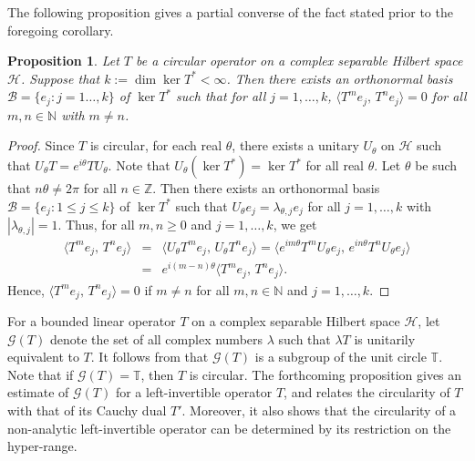 \documentclass[10pt,a4paper]{amsart}
\newtheorem{proposition}[theorem]{Proposition}%
\newcommand{\beqn}{\begin{eqnarray*}}
\newcommand{\eeqn}{\end{eqnarray*}}
\newcommand{\inp}[2]{\langle{#1},\,{#2} \rangle}
\begin{document}
The following proposition gives a partial converse of the fact stated prior to the foregoing corollary.

\begin{proposition}
Let $T$ be a circular operator on a complex separable Hilbert space $\mathcal H$. Suppose that $k := \dim \ker T^* < \infty$. Then there exists an orthonormal basis $\mathscr B = \{e_j : j=1 \ldots, k\}$ of $\ker T^*$ such that for all $j = 1, \ldots, k$, $\inp{T^m e_j}{T^n e_j} = 0$ for all $m, n \in \mathbb N$ with $m \neq n$.
\end{proposition}

\begin{proof}
Since $T$ is circular, for each real $\theta$, there exists a unitary $U_\theta$ on $\mathcal H$ such that $U_\theta T = e^{i\theta} T U_\theta$. Note that $U_\theta(\ker T^*) = \ker T^*$ for all real $\theta$. Let $\theta$ be such that $n\theta \neq 2\pi$ for all $n \in \mathbb Z$. Then there exists an orthonormal basis $\mathscr B = \{e_j : 1 \leqslant j \leqslant k\}$ of $\ker T^*$ such that $U_\theta e_j = \lambda_{\theta,j} e_j$ for all $j = 1, \ldots, k$ with $|\lambda_{\theta,j}| = 1$. Thus, for all $m, n \geqslant 0$ and $j = 1, \ldots, k$, we get
\beqn
\inp{T^m e_j}{T^n e_j} &=& \inp{U_\theta T^m e_j}{U_\theta T^n e_j} = \inp{e^{im\theta} T^m U_\theta e_j}{e^{in\theta}T^n U_\theta e_j}\\
&=& e^{i(m-n)\theta}\inp{T^m e_j}{T^n e_j}.
\eeqn
Hence, $\inp{T^m e_j}{T^n e_j} = 0$ if $m \neq n$ for all $m, n \in \mathbb N$ and $j = 1, \ldots, k$.
\end{proof}

For a bounded linear operator $T$ on a complex separable Hilbert space $\mathcal H$, let $\mathcal G(T)$ denote the set of all complex numbers $\lambda$ such that $\lambda T$ is unitarily equivalent to $T$. It follows from \cite[Lemma 1.1]{AHHK} that $\mathcal G(T)$ is a subgroup of the unit circle $\mathbb T$. Note that if $\mathcal G(T) = \mathbb T$, then $T$ is circular. The forthcoming proposition gives an estimate of $\mathcal G(T)$ for a left-invertible operator $T$, and relates the circularity of $T$ with that of its Cauchy dual $T'$. Moreover, it also shows that the circularity of a non-analytic left-invertible operator can be determined by its restriction on the hyper-range.
\end{document}
